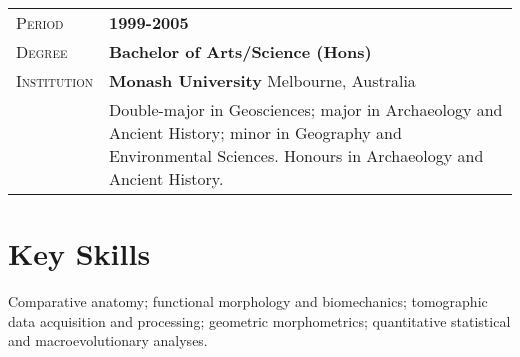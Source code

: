 \documentclass[a4paper, oneside, final]{scrartcl} %
\newcommand{\gray}{\rowcolor[gray]{1}} %
\begin{document}
\begin{center}
\vspace{12pt}

\begin{tabularx}{0.97\linewidth}{>{\raggedleft\scshape}p{2cm}X}
\gray Period & \textbf{1999-2005}\\
\gray Degree & \textbf{Bachelor of Arts/Science (Hons)}\\
\gray Institution & \textbf{Monash University} \hfill Melbourne, Australia\\
& Double-major in Geosciences; major in Archaeology and Ancient History; minor in Geography and Environmental Sciences. Honours in Archaeology and Ancient History. 
\end{tabularx}


\section{Key Skills}

\begin{flushleft}
Comparative anatomy; functional morphology and biomechanics; tomographic data acquisition and processing; geometric morphometrics; quantitative statistical and macroevolutionary analyses.
\end{flushleft}



\end{center}
\end{document}
